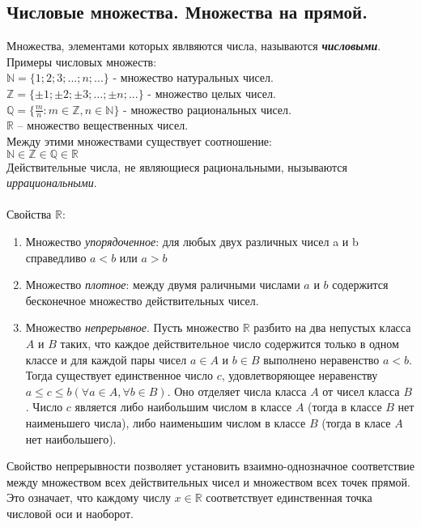 \documentclass[12pt, fleqn]{article}
\begin{document}
	\subsection{Числовые множества. Множества на прямой.}
	Множества, элементами которых явлвяются числа, называются \textbf{\textit{числовыми}}.\\
	Примеры числовых множеств: \\
	$\mathbb{N} = \{1; 2; 3; ...; n; ...\}$ - множество натуральных чисел.\\
	$\mathbb{Z} = \{\pm1; \pm2; \pm3; ...; \pm n; ...\}$ - множество целых чисел.\\
	$\mathbb{Q} = \{\frac m n\colon  m \in \mathbb{Z}, n \in \mathbb{N} \}$ - множество рациональных чисел.\\
	$\mathbb{R}$ -- множество вещественных чисел.\\
	Между этими множествами существует соотношение: \\
	$\mathbb{N \in Z \in Q \in R}$\\
	Действительные числа, не являющиеся рациональными, нызываются \textit{иррациональными}.\\\\
	Свойства $\mathbb{R}$:
	\begin{enumerate}
		\item Множество \textit{упорядоченное}:  для любых двух различных чисел a и b справедливо $a < b$ или $a > b$
		\item Множество \textit{плотное}:  между двумя раличными числами $a$ и $b$ содержится бесконечное множество действительных чисел.
		\item Множество \textit{непрерывное}. Пусть множество $\mathbb{R}$ разбито на два непустых класса $A$ и $B$ таких, что каждое действительное число содержится только в одном классе и для каждой пары чисел $a \in A$ и $b \in B$ выполнено неравенство $a<b$. Тогда существует единственное число $c$, удовлетворяющее неравенству $a \leq c \leq b  (\forall a \in A, \forall b \in B)$. Оно отделяет числа класса $A$ от чисел класса $B$. Число $c$ является либо наибольшим числом в классе $A$ (тогда в классе $B$ нет наименьшего числа), либо наименьшим числом в классе $B$ (тогда в класе $A$ нет наибольшего).
	\end{enumerate}
	Свойство непрерывности позволяет установить взаимно-однозначное соответствие между множеством всех действительных чисел и множеством всех точек прямой. Это означает, что каждому числу $x \in \mathbb{R}$ соответствует единственная точка числовой оси и наоборот.\\\\
\end{document}
